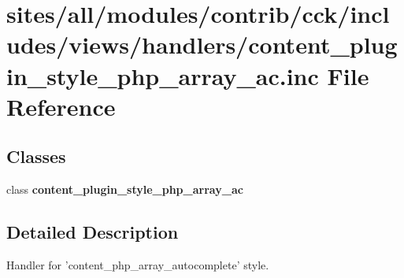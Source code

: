 \hypertarget{content__plugin__style__php__array__ac_8inc}{
\section{sites/all/modules/contrib/cck/includes/views/handlers/content\_\-plugin\_\-style\_\-php\_\-array\_\-ac.inc File Reference}
\label{content__plugin__style__php__array__ac_8inc}
}
\subsection*{Classes}
\begin{CompactItemize}
\item 
class \textbf{content\_\-plugin\_\-style\_\-php\_\-array\_\-ac}
\end{CompactItemize}


\subsection{Detailed Description}
Handler for 'content\_\-php\_\-array\_\-autocomplete' style. 